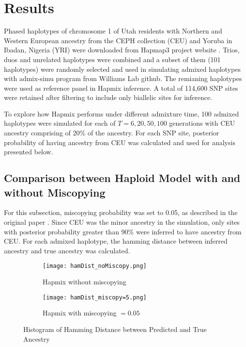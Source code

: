 \documentclass{article}
\begin{document}
\section{Results}
    Phased haplotypes of chromosome 1 of Utah residents with Northern and Western European ancestry from the CEPH collection (CEU) and Yoruba in Ibadan, Nigeria (YRI) were downloaded from Hapmap3 project website \cite{hapmap3}. Trios, duos and unrelated haplotypes were combined and a subset of them (101 haplotypes) were randomly selected and used in simulating admixed haplotypes with admix-simu program from Williams Lab github. The remianing haplotypes were used as reference panel in Hapmix inference. A total of 114,600 SNP sites were retained after filtering to include only biallelic sites for inference.
    
    To explore how Hapmix performs under different admixture time, 100 admixed haplotypes were simulated for each of $T=6,20,50,100$ generations with CEU ancestry comprising of 20\% of the ancestry. For each SNP site, posterior probability of having ancestry from CEU was calculated and used for analysis presented below.
    
\subsection{Comparison between Haploid Model with and without Miscopying}
    For this subsection, miscopying probability was set to 0.05, as described in the original paper \cite{hapmix}. Since CEU was the minor ancestry in the simulation, only sites with posterior probability greater than 90\% were inferred to have ancestry from CEU. For each admixed haplotype, the hamming distance between inferred ancestry and true ancestry was calculated.
    
    \begin{figure}[H]
     \centering
     \begin{subfigure}[b]{0.45\textwidth}
         \centering
         \texttt{[image: hamDist\_noMiscopy.png]}
         \caption{Hapmix without miscopying}
         \label{fig:nomiscopy}
     \end{subfigure}
     \hfill
     \begin{subfigure}[b]{0.45\textwidth}
         \centering
         \texttt{[image: hamDist\_miscopy=5.png]}
         \caption{Hapmix with miscopying $=0.05$}
         \label{fig:miscopy}
     \end{subfigure}
        \caption{Histogram of Hamming Distance between Predicted and True Ancestry}
        \label{fig:ham distance}
\end{figure}
    
\end{document}
